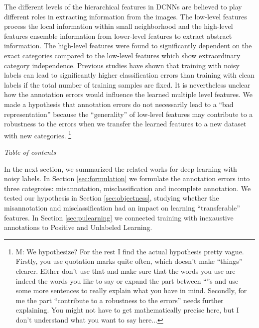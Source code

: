 \noindent
The different levels of the hierarchical features in DCNNs are believed to play different roles in extracting information from the images.
The low-level features process the local information within small neighborhood and the high-level features ensemble information from lower-level features to extract abstract information.
The high-level features were found to significantly dependent on the exact categories compared to the low-level features which show extraordinary category independence.\cite{yosinski2014transferable}
Previous studies\cite{sukhbaatar2014training,patrini2016making} have shown that training with noisy labels can lead to significantly higher classification errors than training with clean labels if the total number of training samples are fixed.
It is nevertheless unclear how the annotation errors would influence the learned multiple level features.
We made a hypothesis that annotation errors do not necessarily lead to a ``bad representation'' because the ``generality'' of low-level features may contribute to a robustness to the errors when we transfer the learned features to a new dataset with new categories.
\footnote{M: We hypothesize?
For the rest I find the actual hypothesis pretty vague.  Firstly, you use quotation marks quite often, which doesn't make ``things'' clearer.  Either don't use that and make sure that the words you use are indeed the words you like to say or expand the part between ``''s and use some more sentences to really explain what you have in  mind.  Secondly, for me the part ``contribute to a robustness to the errors'' needs further explaining.  You might not have to get mathematically precise here, but I don't understand what you want to say here...}

\noindent
\textit{Table of contents}

\noindent
In the next section, we summarized the related works for deep learning with noisy labels.
In Section \ref{sec:formulation} we formulate the annotation errors into three categroies: misannotation, misclassification and incomplete annotation.
We tested our hypothesis in Section \ref{sec:objectness}, studying whether the misannotation and misclassification had an impact on learning ``transferable'' features.
In Section \ref{sec:pulearning} we connected training with inexaustive annotations to Positive and Unlabeled Learning.


%
